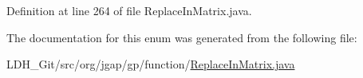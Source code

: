 Definition at line 264 of file Replace\-In\-Matrix.\-java.



The documentation for this enum was generated from the following file\-:\begin{DoxyCompactItemize}
\item 
L\-D\-H\-\_\-\-Git/src/org/jgap/gp/function/\hyperlink{_replace_in_matrix_8java}{Replace\-In\-Matrix.\-java}\end{DoxyCompactItemize}
